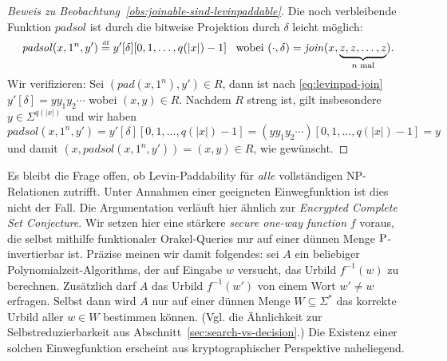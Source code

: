 \begin{proof}[Beweis zu Beobachtung~\ref{obs:joinable-sind-levinpaddable}]
    Die noch verbleibende Funktion $\mathit{padsol}$ ist durch die bitweise Projektion durch $\delta$ leicht möglich:
    \[
    \mathit{padsol}(x, 1^n, y') \defeq  y'[\delta][0, 1, \ldots, q(|x|)-1] \enspace\text{ wobei } (\cdot, \delta) = \mathit{join}(x, \underbrace{z,z,\ldots, z}_{\text{$n$ mal}}).\]
    Wir verifizieren: Sei $(\mathit{pad}(x, 1^n), y')\in R$, dann ist nach \eqref{eq:levinpad-join} $y'[\delta]=yy_1y_2\cdots$ wobei $(x,y)\in R$. Nachdem $R$ streng ist, gilt insbesondere $y\in\Sigma^{q(|x|)}$ und wir haben
\[ \mathit{padsol}(x, 1^n, y') = y'[\delta][0, 1, \ldots, q(|x|)-1] = (yy_1y_2\cdots)[0,1,\ldots,q(|x|)-1] = y \]
    und damit $(x, \mathit{padsol}(x, 1^n, y')) = (x, y)\in R$, wie gewünscht.
\end{proof}

Es bleibt die Frage offen, ob Levin-Paddability für \emph{alle} vollständigen NP-Relationen zutrifft. Unter Annahmen einer geeigneten Einwegfunktion ist dies nicht der Fall.
Die Argumentation verläuft hier ähnlich zur \emph{Encrypted Complete Set Conjecture}.
Wir setzen hier eine stärkere \emph{secure one-way function} \parencite{grollmann_complexity_1988} $f$ voraus, die selbst mithilfe funktionaler Orakel-Queries nur auf einer dünnen Menge $\P$-invertierbar ist.
Präzise meinen wir damit folgendes: sei $A$ ein beliebiger Polynomialzeit-Algorithms, der auf Eingabe $w$ versucht, das Urbild $f^{-1}(w)$ zu berechnen. Zusätzlich darf $A$ das Urbild $f^{-1}(w')$ von einem Wort $w'\neq w$ erfragen. Selbst dann wird $A$ nur auf einer dünnen Menge $W\subseteq\Sigma^*$ das korrekte Urbild aller $w\in W$ bestimmen können.
(Vgl. die Ähnlichkeit zur Selbstreduzierbarkeit aus Abschnitt~\ref{sec:search-vs-decision}.)
Die Existenz einer solchen Einwegfunktion erscheint aus kryptographischer Perspektive naheliegend.


